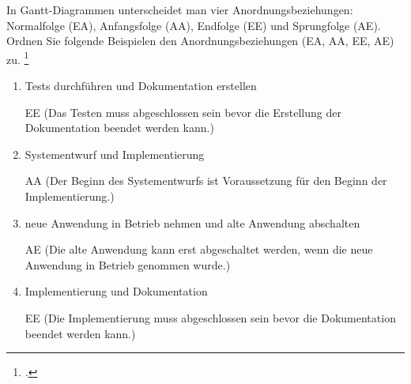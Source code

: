 \documentclass{bschlangaul-aufgabe}
\begin{document}

In Gantt-Diagrammen unterscheidet man vier Anordnungsbeziehungen:
Normalfolge (EA), Anfangsfolge (AA), Endfolge (EE) und Sprungfolge
(AE). Ordnen Sie folgende Beispielen den Anordnungsbeziehungen (EA, AA,
EE, AE) zu.
\footcite[Seite 1]{sosy:ab:5}

\begin{enumerate}


\item Tests durchführen und Dokumentation erstellen

\begin{bAntwort}
EE (Das Testen muss abgeschlossen sein bevor die Erstellung der
Dokumentation beendet werden kann.)
\end{bAntwort}


\item Systementwurf und Implementierung

\begin{bAntwort}
AA (Der Beginn des Systementwurfs ist Voraussetzung für den Beginn der
Implementierung.)
\end{bAntwort}


\item neue Anwendung in Betrieb nehmen und alte Anwendung abschalten

\begin{bAntwort}
AE (Die alte Anwendung kann erst abgeschaltet werden, wenn die neue
Anwendung in Betrieb genommen wurde.)
\end{bAntwort}


\item Implementierung und Dokumentation

\begin{bAntwort}
EE (Die Implementierung muss abgeschlossen sein bevor die Dokumentation
beendet werden kann.)
\end{bAntwort}


\end{enumerate}
\end{document}
